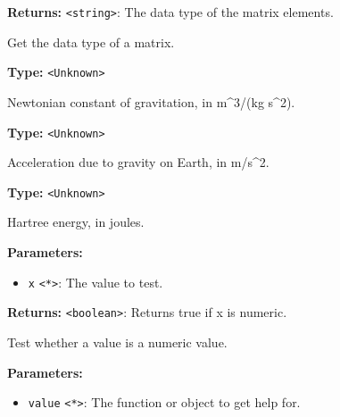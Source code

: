 \documentclass[12pt,a4paper]{article}
\begin{document}
\noindent \textbf{Returns:} \texttt{<string>}: The data type of the matrix elements.

\noindent Get the data type of a matrix.

\vspace{5mm}
\noindent {}\vspace{4mm}


\noindent \textbf{Type:} \texttt{<Unknown>}

\noindent Newtonian constant of gravitation, in m\textasciicircum{}3/(kg s\textasciicircum{}2).

\vspace{5mm}
\noindent {}\vspace{4mm}


\noindent \textbf{Type:} \texttt{<Unknown>}

\noindent Acceleration due to gravity on Earth, in m/s\textasciicircum{}2.

\vspace{5mm}
\noindent {}\vspace{4mm}


\noindent \textbf{Type:} \texttt{<Unknown>}

\noindent Hartree energy, in joules.

\vspace{5mm}
\noindent {}


\noindent \textbf{Parameters:}
\begin{itemize}
  \item \texttt{x} \texttt{<*>}: The value to test.
\end{itemize}

\noindent \textbf{Returns:} \texttt{<boolean>}: Returns true if x is numeric.

\noindent Test whether a value is a numeric value.

\vspace{5mm}
\noindent {}


\noindent \textbf{Parameters:}
\begin{itemize}
  \item \texttt{value} \texttt{<*>}: The function or object to get help for.
\end{itemize}
\end{document}
